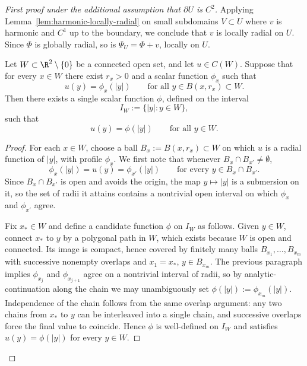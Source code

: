 \begin{proof}[First proof under the additional assumption that $\partial U$ is $C^2$]
Applying Lemma~\ref{lem:harmonic-locally-radial} on small subdomains
$V\subset U$ where $v$ is harmonic and $C^1$ up to the boundary, we
conclude that $v$ is locally radial on $U$. Since $\Phi$ is globally
radial, so is $\Psi_U=\Phi+v$, locally on $U$.

\begin{lemma}\label{lem:local-to-global-radial}
Let \(W\subset \R^2\setminus\{0\}\) be a connected open set, and let
\(u\in C(W)\). Suppose that for every \(x\in W\) there exist \(r_x>0\)
and a scalar function \(\phi_x\) such that
\[
u(y)=\phi_x(|y|)
\qquad\text{for all } y\in B(x,r_x)\subset W.
\]
Then there exists a single scalar function \(\phi\), defined on the
interval
\[
I_W:=\{|y|:y\in W\},
\]
such that
\[
u(y)=\phi(|y|)
\qquad\text{for all } y\in W.
\]
\end{lemma}

\begin{proof}
For each \(x\in W\), choose a ball \(B_x:=B(x,r_x)\subset W\) on which
\(u\) is a radial function of \(|y|\), with profile $\phi_x$. We
first note that whenever $B_x\cap B_{x'}\ne\emptyset$,
\[
\phi_x(|y|)=u(y)=\phi_{x'}(|y|)
\qquad\text{for every }y\in B_x\cap B_{x'}.
\]
Since $B_x\cap B_{x'}$ is open and avoids the origin, the map $y\mapsto
|y|$ is a submersion on it, so the set of radii it attains contains a
nontrivial open interval on which $\phi_x$ and $\phi_{x'}$ agree.

Fix $x_*\in W$ and define a candidate function $\phi$ on $I_W$ as
follows. Given $y\in W$, connect $x_*$ to $y$ by a polygonal path in
$W$, which exists because $W$ is open and connected. Its image is
compact, hence covered by finitely many balls
$B_{x_1},\dots,B_{x_m}$ with successive nonempty overlaps and
$x_1=x_*$, $y\in B_{x_m}$. The previous paragraph implies $\phi_{x_j}$
and $\phi_{x_{j+1}}$ agree on a nontrivial interval of radii, so by
analytic-continuation along the chain we may unambiguously set
$\phi(|y|):=\phi_{x_m}(|y|)$. Independence of the chain follows from
the same overlap argument: any two chains from $x_*$ to $y$ can be
interleaved into a single chain, and successive overlaps force the
final value to coincide. Hence $\phi$ is well-defined on $I_W$ and
satisfies $u(y)=\phi(|y|)$ for every $y\in W$.
\end{proof}


\end{proof}

